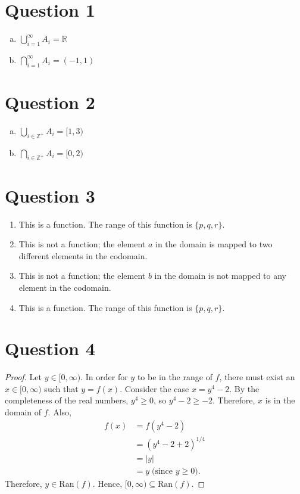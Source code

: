 \documentclass{article}
\begin{document}
\section*{Question 1}
\begin{enumerate}[(a)]
    \item $\bigcup_{i=1}^{\infty} A_i = \mathbb{R}$
    \item $\bigcap_{i=1}^{\infty} A_i = (-1, 1)$
\end{enumerate}

\section*{Question 2}
\begin{enumerate}[(a)]
    \item $\bigcup_{i \in \mathbb{Z}^+} A_i = [1, 3)$
    \item $\bigcap_{i \in \mathbb{Z}^+} A_i = [0, 2)$
\end{enumerate}

\section*{Question 3}
\begin{enumerate}
    \item This is a function. The range of this function is $\{p, q, r\}$.
    \item This is not a function; the element $a$ in the domain is mapped to two different elements in the codomain.
    \item This is not a function; the element $b$ in the domain is not mapped to any element in the codomain.
    \item This is a function. The range of this function is $\{p, q, r\}$.
\end{enumerate}

\section*{Question 4}
\begin{proof}
    Let $y \in [0, \infty)$.
    In order for $y$ to be in the range of $f$, there must exist an $x \in [0, \infty)$ such that $y = f(x)$.
    Consider the case $x = y^4 - 2$.
    By the completeness of the real numbers, $y^4 \geq 0$, so $y^4 - 2 \geq -2$.
    Therefore, $x$ is in the domain of $f$.
    Also,
    \begin{align*}
        f(x) &= f(y^4 - 2) \\
        &= (y^4 - 2 + 2)^{1/4} \\
        &= |y| \\
        &= y \; \text{(since $y \geq 0$)}.
    \end{align*}
    Therefore, $y \in \text{Ran}(f)$. Hence, $[0, \infty) \subseteq \text{Ran}(f)$.
\end{proof}
\end{document}
